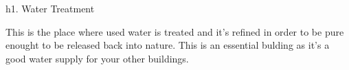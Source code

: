h1. Water Treatment

This is the place where used water is treated and it's refined in order to be pure enought to be released back into nature. This is an essential bulding as it's a good water supply for your other buildings.